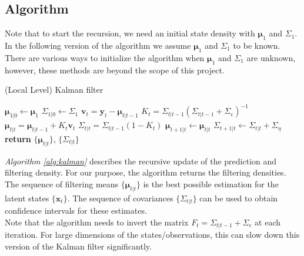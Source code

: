 \documentclass[11pt, oneside]{scrreprt}   	%
\begin{document}
\subsection{Algorithm}
Note that to start the recursion, we need an initial state density with $\boldsymbol{\mu}_1$ and $\Sigma_1$. In the following version of the algorithm we assume $\boldsymbol{\mu}_1$ and $\Sigma_1$ to be known. There are various ways to initialize the algorithm when $\boldsymbol{\mu}_1$ and $\Sigma_1$ are unknown, however, these methods are beyond the scope of this project.\\

\begin{algorithm}[h!]
\caption{(Local Level) Kalman filter}
\label{alg:kalman}
  \begin{algorithmic}[1]
      \smallskip
      \State $\boldsymbol{\mu}_{1 | 0}\gets \boldsymbol{\mu}_1$
      \State $\Sigma_{1 | 0}\gets \Sigma_1$
      \smallskip
      	\State $\boldsymbol{v}_t = \boldsymbol{y}_t - \boldsymbol{\mu}_{t | t-1}$
      	\State $K_t = \Sigma_{t | t-1} (\Sigma_{t | t-1} + \Sigma_{\epsilon})^{-1}$
	\smallskip
      	\State $\boldsymbol{\mu}_{t | t} = \boldsymbol{\mu}_{t | t-1} + K_t \boldsymbol{v}_t$
      	\State $\Sigma_{t | t} = \Sigma_{t | t-1}(1 - K_t)$
	\smallskip
      	\State $\boldsymbol{\mu}_{t+1 | t}\gets \boldsymbol{\mu}_{t | t}$
      	\State $\Sigma_{t+1 | t}\gets \Sigma_{t | t} + \Sigma_{\eta}$
      \EndFor
      \State \textbf{return} $\{\boldsymbol{\mu}_{t | t}\}$, $\{\Sigma_{t | t}\}$
    \EndProcedure
  \end{algorithmic}
\end{algorithm}
\textit{Algorithm \ref{alg:kalman}} describes the recursive update of the prediction and filtering density.  For our purpose, the algorithm returns the filtering densities. 
The sequence of filtering means $\{\boldsymbol{\mu}_{t | t}\}$ is the best possible estimation for the latent states $\{\boldsymbol{x}_t\}$. 
The sequence of covariances $\{\Sigma_{t | t}\}$ can be used to obtain confidence intervals for these estimates. \\  

Note that the algorithm needs to invert the matrix $F_t = \Sigma_{t | t-1} + \Sigma_{\epsilon}$ at each iteration. For large dimensions of the states/observations, this can slow down this version of the Kalman filter significantly.
\end{document}
